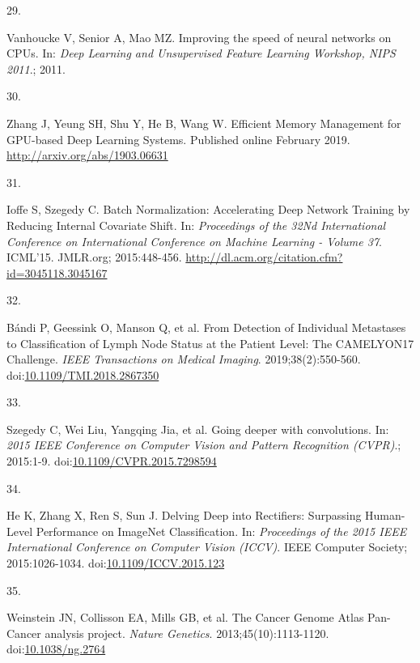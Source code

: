 \documentclass[
  12pt,
  a5,margin=2cmpaper,
]{article}
\newlength{\cslhangindent}
\newlength{\csllabelwidth}
\newlength{\cslentryspacingunit} %
\newenvironment{CSLReferences}[2] %
 {%
  \setlength{\parindent}{0pt}
  \ifodd #1
  \let\oldpar\par
  \def\par{\hangindent=\cslhangindent\oldpar}
  \fi
  \setlength{\parskip}{#2\cslentryspacingunit}
 }%
 {}
\newcommand{\CSLLeftMargin}[1]{\parbox[t]{\csllabelwidth}{#1}}
\newcommand{\CSLRightInline}[1]{\parbox[t]{\linewidth - \csllabelwidth}{#1}\break}
\begin{document}
\begin{CSLReferences}{0}{0}
\leavevmode{}%
\CSLLeftMargin{29. }%
\CSLRightInline{Vanhoucke V, Senior A, Mao MZ. {Improving the speed of
neural networks on CPUs}. In: \emph{Deep Learning and Unsupervised
Feature Learning Workshop, NIPS 2011}.; 2011.}

\leavevmode{}%
\CSLLeftMargin{30. }%
\CSLRightInline{Zhang J, Yeung SH, Shu Y, He B, Wang W. {Efficient
Memory Management for GPU-based Deep Learning Systems}. Published online
February 2019. \url{http://arxiv.org/abs/1903.06631}}

\leavevmode{}%
\CSLLeftMargin{31. }%
\CSLRightInline{Ioffe S, Szegedy C. {Batch Normalization: Accelerating
Deep Network Training by Reducing Internal Covariate Shift}. In:
\emph{Proceedings of the 32Nd International Conference on International
Conference on Machine Learning - Volume 37}. ICML'15. JMLR.org;
2015:448-456. \url{http://dl.acm.org/citation.cfm?id=3045118.3045167}}

\leavevmode{}%
\CSLLeftMargin{32. }%
\CSLRightInline{Bándi P, Geessink O, Manson Q, et al. {From Detection of
Individual Metastases to Classification of Lymph Node Status at the
Patient Level: The CAMELYON17 Challenge}. \emph{IEEE Transactions on
Medical Imaging}. 2019;38(2):550-560.
doi:\href{https://doi.org/10.1109/TMI.2018.2867350}{10.1109/TMI.2018.2867350}}

\leavevmode{}%
\CSLLeftMargin{33. }%
\CSLRightInline{Szegedy C, Wei Liu, Yangqing Jia, et al. {Going deeper
with convolutions}. In: \emph{2015 IEEE Conference on Computer Vision
and Pattern Recognition (CVPR)}.; 2015:1-9.
doi:\href{https://doi.org/10.1109/CVPR.2015.7298594}{10.1109/CVPR.2015.7298594}}

\leavevmode{}%
\CSLLeftMargin{34. }%
\CSLRightInline{He K, Zhang X, Ren S, Sun J. {Delving Deep into
Rectifiers: Surpassing Human-Level Performance on ImageNet
Classification}. In: \emph{Proceedings of the 2015 IEEE International
Conference on Computer Vision (ICCV)}. IEEE Computer Society;
2015:1026-1034.
doi:\href{https://doi.org/10.1109/ICCV.2015.123}{10.1109/ICCV.2015.123}}

\leavevmode{}%
\CSLLeftMargin{35. }%
\CSLRightInline{Weinstein JN, Collisson EA, Mills GB, et al. {The Cancer
Genome Atlas Pan-Cancer analysis project}. \emph{Nature Genetics}.
2013;45(10):1113-1120.
doi:\href{https://doi.org/10.1038/ng.2764}{10.1038/ng.2764}}


\end{CSLReferences}
\end{document}
